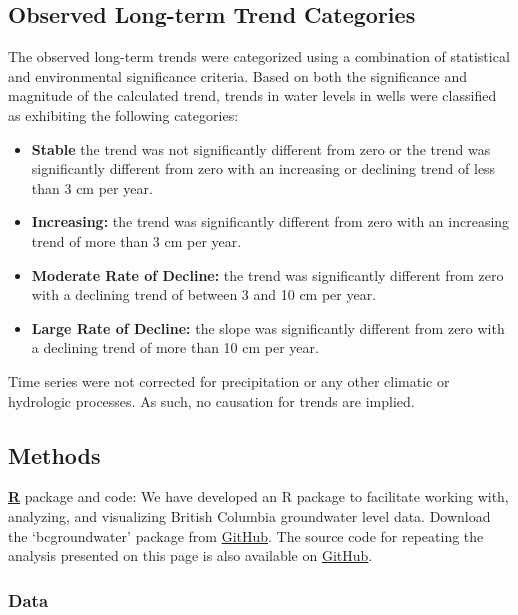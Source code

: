 \documentclass[
]{article}
\providecommand{\tightlist}{%
  \setlength{\itemsep}{0pt}\setlength{\parskip}{0pt}}
\begin{document}
\hypertarget{observed-long-term-trend-categories}{%
\subsection{Observed Long-term Trend
Categories}\label{observed-long-term-trend-categories}}

The observed long-term trends were categorized using a combination of
statistical and environmental significance criteria. Based on both the
significance and magnitude of the calculated trend, trends in water
levels in wells were classified as exhibiting the following categories:

\begin{itemize}
\tightlist
\item
  \textbf{Stable} the trend was not significantly different from zero or
  the trend was significantly different from zero with an increasing or
  declining trend of less than 3 cm per year.
\item
  \textbf{Increasing:} the trend was significantly different from zero
  with an increasing trend of more than 3 cm per year.
\item
  \textbf{Moderate Rate of Decline:} the trend was significantly
  different from zero with a declining trend of between 3 and 10 cm per
  year.
\item
  \textbf{Large Rate of Decline:} the slope was significantly different
  from zero with a declining trend of more than 10 cm per year.
\end{itemize}

Time series were not corrected for precipitation or any other climatic
or hydrologic processes. As such, no causation for trends are implied.

\hypertarget{methods}{%
\subsection{Methods}\label{methods}}

\href{http://www.r-project.org}{\textbf{R}} package and code: We have
developed an R package to facilitate working with, analyzing, and
visualizing British Columbia groundwater level data. Download the
`bcgroundwater' package from
\href{https://github.com/bcgov/bcgroundwater}{GitHub}. The source code
for repeating the analysis presented on this page is also available on
\href{https://github.com/bcgov/groundwater-levels-indicator}{GitHub}.

\hypertarget{data}{%
\subsubsection{Data}\label{data}}
\end{document}

